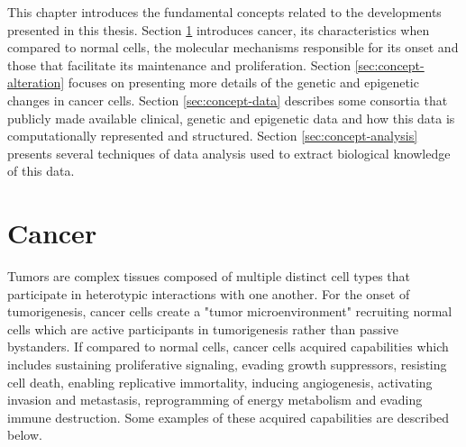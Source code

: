 This chapter introduces the fundamental concepts related to the developments presented in this thesis.
Section \ref{sec:concept-cancer} introduces cancer, its characteristics when compared to normal cells,
the molecular mechanisms responsible for its onset and those that facilitate its maintenance and proliferation.
Section \ref{sec:concept-alteration} focuses on presenting more details of the genetic and
epigenetic changes in cancer cells.
Section \ref{sec:concept-data} describes some consortia that publicly made available clinical, genetic and epigenetic data
and how this data is computationally represented and structured.
Section \ref{sec:concept-analysis} presents several techniques of data analysis
used to extract biological knowledge of this data.

\section{Cancer} \label{sec:concept-cancer}

Tumors are complex tissues composed of multiple distinct cell types that participate in heterotypic interactions with one another. For the onset of tumorigenesis,  cancer cells create a "tumor microenvironment"
 recruiting normal cells which are active participants in tumorigenesis rather than passive bystanders.
If compared to normal cells, cancer cells acquired capabilities which includes sustaining proliferative signaling,
 evading growth suppressors, resisting cell death, enabling replicative immortality,
 inducing angiogenesis, activating invasion and metastasis, reprogramming of energy metabolism and
 evading immune destruction.  Some examples of these acquired capabilities are described below.


